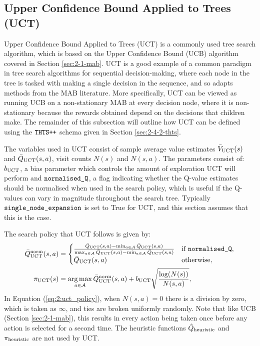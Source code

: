     



    
\subsection{Upper Confidence Bound Applied to Trees (UCT)}
\label{sec:2-4-2-uct}

    Upper Confidence Bound Applied to Trees (UCT) \cite{uct,uct_long} is a commonly used tree search algorithm, which is based on the Upper Confidence Bound (UCB) algorithm covered in Section \ref{sec:2-1-mab}. UCT is a good example of a common paradigm in tree search algorithms for sequential decision-making, where each node in the tree is tasked with making a single decision in the sequence, and so adapts methods from the MAB literature. More specifically, UCT can be viewed as running UCB on a non-stationary MAB at every decision node, where it is non-stationary because the rewards obtained depend on the decisions that children make. The remainder of this subsection will outline how UCT can be defined using the ${\textnormal{\texttt{THTS++}}}$ schema given in Section \ref{sec:2-4-2-thts}.

    The variables used in UCT consist of sample average value estimates ${\bar{V}_{{\textnormal{UCT}}}}(s)$ and ${\bar{Q}_{{\textnormal{UCT}}}}(s,a)$, visit counts $N(s)$ and $N(s,a)$. The parameters consist of: ${b_{{\textnormal{UCT}}}}$, a bias parameter which controls the amount of exploration UCT will perform and ${\textnormal{\texttt{normalised\_Q}}}$, a flag indicating whether the Q-value estimates should be normalised when used in the search policy, which is useful if the Q-values can vary in magnitude throughout the search tree. Typically ${\textnormal{\texttt{single\_node\_expansion}}}$ is set to True for UCT, and this section assumes that this is the case.

    The search policy that UCT follows is given by:
    \begin{align}
        {\bar{Q}^{{\textnormal{norm}}}_{{\textnormal{UCT}}}}(s,a) &= 
        \begin{cases}
            \frac{{\bar{Q}_{{\textnormal{UCT}}}}(s,a)-\min_{a\in\mathcal{A}}{\bar{Q}_{{\textnormal{UCT}}}}(s,a)}{\max_{a\in\mathcal{A}}{\bar{Q}_{{\textnormal{UCT}}}}(s,a)-\min_{a\in\mathcal{A}}{\bar{Q}_{{\textnormal{UCT}}}}(s,a)} & \text{if } {\textnormal{\texttt{normalised\_Q}}}, \\
            {\bar{Q}_{{\textnormal{UCT}}}}(s,a) & \text{otherwise,}
        \end{cases} \\
        {\pi_{{\textnormal{UCT}}}}(s) &= \operatorname*{arg\,max}_{a\in\mathcal{A}} {\bar{Q}^{{\textnormal{norm}}}_{{\textnormal{UCT}}}}(s,a) + {b_{{\textnormal{UCT}}}} \sqrt{\frac{\log(N(s))}{N(s,a)}}, \label{eq:2:uct_policy}
    \end{align}
    In Equation (\ref{eq:2:uct_policy}), when $N(s,a)=0$ there is a division by zero, which is taken as $\infty$, and ties are broken uniformly randomly. Note that like UCB (Section \ref{sec:2-1-mab}), this results in every action being taken once before any action is selected for a second time. The heuristic functions ${\hat{Q}_{\textnormal{heuristic}}}$ and ${\pi_{\textnormal{heuristic}}}$ are not used by UCT.  
    
